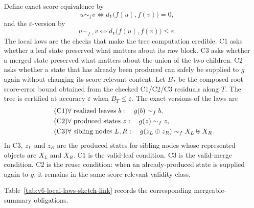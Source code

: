 Define exact score equivalence by
\[
  u\sim_f v
  \Longleftrightarrow
  d_Y\big(f(u),f(v)\big)=0,
\]
and the \(\varepsilon\)-version by
\[
  u\sim_{f,\varepsilon} v
  \Longleftrightarrow
  d_Y\big(f(u),f(v)\big)\le\varepsilon.
\]
The local laws are the checks that make the tree computation credible.  C1
asks whether a leaf state preserved what matters about its raw block.  C3
asks whether a merged state preserved what matters about the union of the two
children.  C2 asks whether a state that has already been produced can safely
be supplied to \(g\) again without changing its score-relevant content.  Let
\(B_T\) be the composed root score-error bound obtained from the checked
C1/C2/C3 residuals along \(T\).  The tree is certified at accuracy
\(\varepsilon\) when \(B_T\le\varepsilon\).  The exact versions of the laws
are
\begin{align}
\tag{C1}
&\forall\text{ realized leaves }b:\quad g(b)\sim_f b,\\
\tag{C2}
&\forall\text{ produced states }z:\quad g(z)\sim_f z,\\
\tag{C3}
&\forall\text{ sibling nodes }L,R:\quad
  g(z_L\oplus z_R)\sim_f X_L\uplus X_R.
\end{align}
In C3, \(z_L\) and \(z_R\) are the produced states for sibling nodes whose
represented objects are \(X_L\) and \(X_R\).  C1 is the valid-leaf condition.
C3 is the valid-merge condition.  C2 is the reuse condition: when an
already-produced state is supplied again to \(g\), it remains in the same
score-relevant validity class.

Table~\ref{tab:v6-local-laws-sketch-link} records the corresponding
mergeable-summary obligations.

